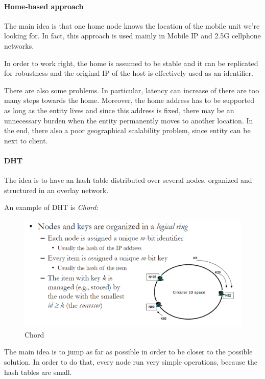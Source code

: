 \paragraph{Home-based approach}\label{home-based-approach}

The main idea is that one home node knows the location of the mobile
unit we're looking for. In fact, this approach is used mainly in Mobile
IP and 2.5G cellphone networks.

In order to work right, the home is assumed to be stable and it can be
replicated for robustness and the original IP of the host is effectively
used as an identifier.

There are also some problems. In particular, latency can increase of
there are too many steps towards the home. Moreover, the home address
has to be supported as long as the entity lives and since this address
is fixed, there may be an unnecessary burden when the entity permanently
moves to another location. In the end, there also a poor geographical
scalability problem, since entity can be next to client.

\paragraph{DHT}\label{dht}

The idea is to have an hash table distributed over several nodes,
organized and structured in an overlay network.

An example of DHT is \emph{Chord}:
\begin{figure}[h]
    \caption{Chord}
    \includegraphics[width=\textwidth]{src/images/dht.png}
    \centering
\end{figure}

The main idea is to jump as far as possible in order to be closer to the
possible solution. In order to do that, every node run very simple
operations, because the hash tables are small.

